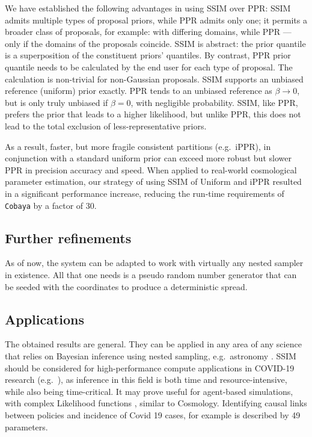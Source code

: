 \documentclass[usenatbib]{mnras}
\begin{document}
We have established the following advantages in using SSIM over PPR:
SSIM admits multiple types of proposal priors, while PPR admits only
one; it permits a broader class of proposals, for example: with
differing domains, while PPR --- only if the domains of the proposals
coincide.  SSIM is abstract: the prior quantile is a superposition of
the constituent priors' quantiles. By contrast, PPR prior quantile
needs to be calculated by the end user for each type of proposal. The
calculation is non-trivial for non-Gaussian proposals. SSIM supports
an unbiased reference (uniform) prior exactly. PPR tends to an
unbiased reference as \(\beta\rightarrow 0 \), but is only truly
unbiased if $\beta=0$, with negligible probability. SSIM, like PPR,
prefers the prior that leads to a higher likelihood, but unlike PPR,
this does not lead to the total exclusion of less-representative
priors.


As a result, faster, but more fragile consistent partitions
(e.g.~iPPR), in conjunction with a standard uniform prior can exceed
more robust but slower PPR in precision accuracy and speed.  When
applied to real-world cosmological parameter estimation, our strategy
of using SSIM of Uniform and iPPR resulted in a significant
performance increase, reducing the run-time requirements of
\texttt{Cobaya} by a factor of 30.

\subsection{Further refinements}\label{sec:org8314ddf}

As of now, the system can be adapted to work with virtually any nested
sampler in existence. All that one needs is a pseudo random number
generator that can be seeded with the coordinates to produce a
deterministic spread.



\subsection{Applications}\label{sec:applications}
The obtained results are general. They can be applied in any area of
any science that relies on Bayesian inference using nested sampling,
e.g.~astronomy \citep{Casado_2016}. SSIM should be considered for
high-performance compute applications in COVID-19 research
(e.g.~\cite{Covid1,Covid2}), as inference in this field is both time
and resource-intensive, while also being time-critical. It may prove
useful for agent-based simulations, with complex Likelihood functions
\citep{Covid2}, similar to Cosmology. Identifying causal links between
policies and incidence of Covid 19 cases, for example is described by
49 parameters.
\end{document}
